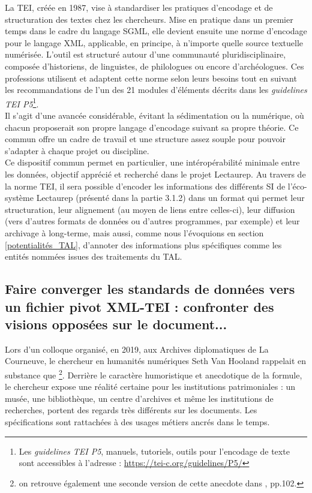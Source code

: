 La TEI, créée en 1987, vise à standardiser les pratiques d'encodage et de structuration des textes chez les chercheurs. Mise en pratique dans un premier temps dans le cadre du langage SGML, elle devient ensuite une norme d'encodage pour le langage XML, applicable, en principe, à n'importe quelle source textuelle numérisée. L'outil est structuré autour d'une communauté pluridisciplinaire, composée d'historiens, de linguistes, de philologues ou encore d'archéologues. Ces professions utilisent et adaptent cette norme selon leurs besoins tout en suivant les recommandations de l'un des 21 modules d'éléments décrits dans les \textit{guidelines TEI P5}\footnote{Les \textit{guidelines TEI P5}, manuels, tutoriels, outils pour l'encodage de texte sont accessibles à l'adresse : \url{https://tei-c.org/guidelines/P5/}}.\\

Il s'agit d'une avancée considérable, évitant la sédimentation ou la  numérique, où chacun proposerait son propre langage d'encodage suivant sa propre théorie. Ce  commun offre un cadre de travail et une structure assez souple pour pouvoir s'adapter à chaque projet ou discipline.\\

Ce dispositif commun permet en particulier, une intéropérabilité minimale entre les données, objectif apprécié et recherché dans le projet Lectaurep. Au travers de la norme TEI, il sera possible d'encoder les informations des différents SI de l'éco-système Lectaurep (présenté dans la partie 3.1.2) dans un format qui permet leur structuration, leur alignement (au moyen de liens entre celles-ci), leur diffusion (vers d'autres formats de données ou d'autres programmes, par exemple) et leur archivage à long-terme, mais aussi, comme nous l'évoquions en section \ref{potentialités_TAL}, d'annoter des informations plus spécifiques comme les entités nommées issues des traitements du TAL. 

\subsection{Faire converger les standards de données vers un fichier pivot XML-TEI : confronter des visions opposées sur le document...}\label{negatif_TEI}

Lors d'un colloque organisé, en 2019, aux Archives diplomatiques de La Courneuve, le chercheur en humanités numériques Seth Van Hooland rappelait en substance que \footnote{\cite{hooland_application_2019} on retrouve également 
une seconde version de cette anecdote dans \cite{gillet_introduction_2016}, pp.102.}. Derrière le caractère humoristique et anecdotique de la formule, le chercheur expose une réalité certaine pour les institutions patrimoniales : un musée, une bibliothèque, un centre d'archives et même les institutions de recherches, portent des regards très différents sur les documents. Les spécifications sont rattachées à des usages métiers ancrés dans le temps.\\

